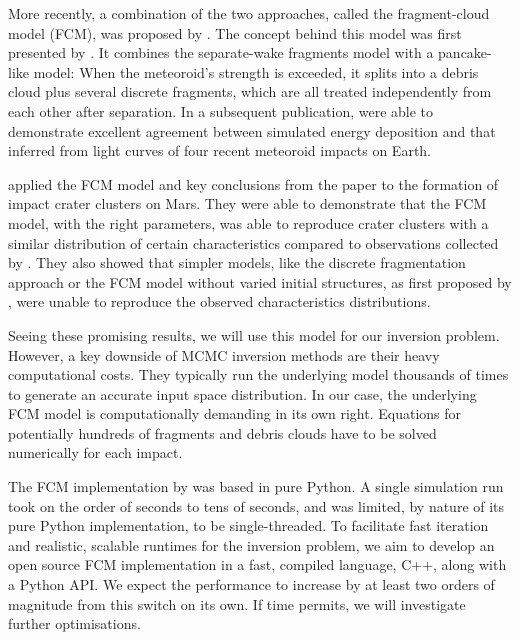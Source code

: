 More recently, a combination of the two approaches, called the fragment-cloud model (FCM), was proposed by \cite{wheeler2017fragmentcloud}.
The concept behind this model was first presented by \cite{mehta2015break}.
It combines the separate-wake fragments model \citep{passey1980effects,artemieva1996interaction} with a pancake-like model:
When the meteoroid's strength is exceeded, it splits into a debris cloud plus several discrete fragments, which are all treated independently from each other after separation.
In a subsequent publication, \cite{wheeler2018atmospheric} were able to demonstrate excellent agreement between simulated energy deposition and that inferred from light curves of four recent meteoroid impacts on Earth.

\cite{newland2019CFM18} applied the FCM model and key conclusions from the \cite{wheeler2018atmospheric} paper to the formation of impact crater clusters on Mars.
They were able to demonstrate that the FCM model, with the right parameters, was able to reproduce crater clusters with a similar distribution of certain characteristics compared to observations collected by \cite{daubar2019recently}.
They also showed that simpler models, like the discrete fragmentation approach or the FCM model without varied initial structures, as first proposed by \cite{wheeler2017fragmentcloud}, were unable to reproduce the observed characteristics distributions.

Seeing these promising results, we will use this model for our inversion problem.
However, a key downside of MCMC inversion methods are their heavy computational costs.
They typically run the underlying model thousands of times to generate an accurate input space distribution.
In our case, the underlying FCM model is computationally demanding in its own right.
Equations for potentially hundreds of fragments and debris clouds have to be solved numerically for each impact.

The FCM implementation by \cite{newland2019CFM18} was based in pure Python.
A single simulation run took on the order of seconds to tens of seconds, and was limited, by nature of its pure Python implementation, to be single-threaded.
To facilitate fast iteration and realistic, scalable runtimes for the inversion problem, we aim to develop an open source FCM implementation in a fast, compiled language, C++, along with a Python API.
We expect the performance to increase by at least two orders of magnitude from this switch on its own.
If time permits, we will investigate further optimisations.
